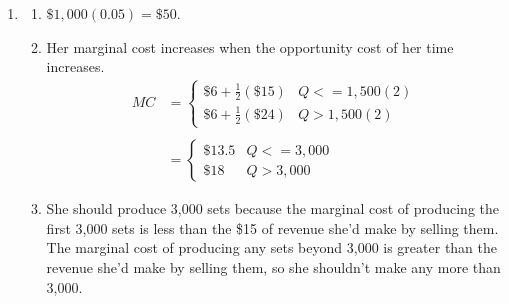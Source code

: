 \documentclass{article}
\begin{document}
\begin{enumerate}
\begin{enumerate}
		\vspace{\baselineskip}
		40: He should purchase 3 trucks because that will minimize his total cost. His average total cost will be $\$10,800 / 40 = \$270$.
		
		\vspace{\baselineskip}
		60: He should purchase 4 trucks because that will minimize his total cost. His average total cost will be $\$16,400 / 60 = \$273.33$
		
	\item After business declines, his average total cost is $\$8,800 / 20 = \$440$ in the short run.
	
		If business booms, his average total cost will be $\$17,800 / 60 = \$296.67$
		
	\item For 20 orders per week, Don's long-run average total cost is \$400 because in the long run he will minimize costs by selling a truck so that he only has two.
	
		His long-run average total cost is lower than his short-run average total cost because in the long run he has the flexibility to manage the number of trucks he owns. His fixed costs become variable, and that allows him to further minimize his costs.
	
	\end{enumerate}
	
\item

	\begin{enumerate}
	
	\item $\$1,000(0.05) = \$50$.
	
	\item Her marginal cost increases when the opportunity cost of her time increases.
		\begin{align*}
		MC &= \begin{cases}
		\$6 + \frac{1}{2}(\$15) & Q <= 1,500(2) \\
		\$6 + \frac{1}{2}(\$24) & Q > 1,500(2)
		\end{cases} \\
		\\
		&= \begin{cases}
		\$13.5 & Q <= 3,000 \\
		\$18 & Q > 3,000
		\end{cases}
		\end{align*}
		
	\item She should produce 3,000 sets because the marginal cost of producing the first 3,000 sets is less than the \$15 of revenue she'd make by selling them. The marginal cost of producing any sets beyond 3,000 is greater than the revenue she'd make by selling them, so she shouldn't make any more than 3,000. 
	

\end{enumerate}
\end{enumerate}
\end{document}
